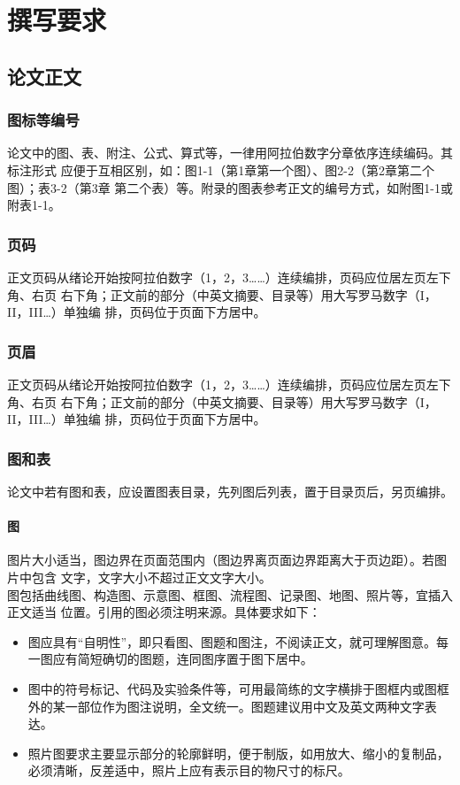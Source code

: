\chapter{撰写要求}

\section{论文正文}
\subsection{图标等编号}

论文中的图、表、附注、公式、算式等，一律用阿拉伯数字分章依序连续编码。其标注形式
应便于互相区别，如：图1-1（第1章第一个图）、图2-2（第2章第二个图）；表3-2（第3章
第二个表）等。附录的图表参考正文的编号方式，如附图1-1或附表1-1。

\subsection{页码}

正文页码从绪论开始按阿拉伯数字（1，2，3……）连续编排，页码应位居左页左下角、右页
右下角；正文前的部分（中英文摘要、目录等）用大写罗马数字（I，II，III…）单独编
排，页码位于页面下方居中。

\subsection{页眉}

正文页码从绪论开始按阿拉伯数字（1，2，3……）连续编排，页码应位居左页左下角、右页
右下角；正文前的部分（中英文摘要、目录等）用大写罗马数字（I，II，III…）单独编
排，页码位于页面下方居中。

\subsection{图和表}

论文中若有图和表，应设置图表目录，先列图后列表，置于目录页后，另页编排。

\subsubsection{图}

图片大小适当，图边界在页面范围内（图边界离页面边界距离大于页边距）。若图片中包含
文字，文字大小不超过正文文字大小。\\
图包括曲线图、构造图、示意图、框图、流程图、记录图、地图、照片等，宜插入正文适当
位置。引用的图必须注明来源。具体要求如下：
\begin{itemize}
    \item 图应具有“自明性”，即只看图、图题和图注，不阅读正文，就可理解图意。每一图应有简短确切的图题，连同图序置于图下居中。
    \item 图中的符号标记、代码及实验条件等，可用最简练的文字横排于图框内或图框外的某一部位作为图注说明，全文统一。图题建议用中文及英文两种文字表达。
    \item 照片图要求主要显示部分的轮廓鲜明，便于制版，如用放大、缩小的复制品，必须清晰，反差适中，照片上应有表示目的物尺寸的标尺。
\end{itemize}

